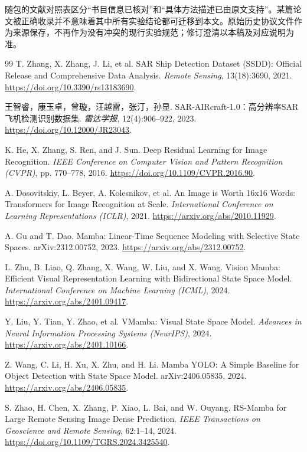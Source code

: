 \documentclass[UTF8,11pt,a4paper,fontset=fandol]{ctexart}
\begin{document}
随包的文献对照表区分“书目信息已核对”和“具体方法描述已由原文支持”。某篇论文被正确收录并不意味着其中所有实验结论都可迁移到本文。原始历史协议文件作为来源保存，不再作为没有冲突的现行实验规范；修订澄清以本稿及对应说明为准。
\FloatBarrier

\begin{thebibliography}{99}
\small
{}
T. Zhang, X. Zhang, J. Li, et al.
SAR Ship Detection Dataset (SSDD): Official Release and Comprehensive Data Analysis.
\emph{Remote Sensing}, 13(18):3690, 2021.
\url{https://doi.org/10.3390/rs13183690}.

王智睿，康玉卓，曾璇，汪越雷，张汀，孙显.
SAR-AIRcraft-1.0：高分辨率SAR飞机检测识别数据集.
\emph{雷达学报}, 12(4):906--922, 2023.
\url{https://doi.org/10.12000/JR23043}.

K. He, X. Zhang, S. Ren, and J. Sun.
Deep Residual Learning for Image Recognition.
\emph{IEEE Conference on Computer Vision and Pattern Recognition (CVPR)},
pp. 770--778, 2016.
\url{https://doi.org/10.1109/CVPR.2016.90}.

A. Dosovitskiy, L. Beyer, A. Kolesnikov, et al.
An Image is Worth 16x16 Words: Transformers for Image Recognition at Scale.
\emph{International Conference on Learning Representations (ICLR)}, 2021.
\url{https://arxiv.org/abs/2010.11929}.

A. Gu and T. Dao.
Mamba: Linear-Time Sequence Modeling with Selective State Spaces.
arXiv:2312.00752, 2023.
\url{https://arxiv.org/abs/2312.00752}.

L. Zhu, B. Liao, Q. Zhang, X. Wang, W. Liu, and X. Wang.
Vision Mamba: Efficient Visual Representation Learning with Bidirectional State Space Model.
\emph{International Conference on Machine Learning (ICML)}, 2024.
\url{https://arxiv.org/abs/2401.09417}.

Y. Liu, Y. Tian, Y. Zhao, et al.
VMamba: Visual State Space Model.
\emph{Advances in Neural Information Processing Systems (NeurIPS)}, 2024.
\url{https://arxiv.org/abs/2401.10166}.

Z. Wang, C. Li, H. Xu, X. Zhu, and H. Li.
Mamba YOLO: A Simple Baseline for Object Detection with State Space Model.
arXiv:2406.05835, 2024.
\url{https://arxiv.org/abs/2406.05835}.

S. Zhao, H. Chen, X. Zhang, P. Xiao, L. Bai, and W. Ouyang.
RS-Mamba for Large Remote Sensing Image Dense Prediction.
\emph{IEEE Transactions on Geoscience and Remote Sensing}, 62:1--14, 2024.
\url{https://doi.org/10.1109/TGRS.2024.3425540}.


\end{thebibliography}
\end{document}
